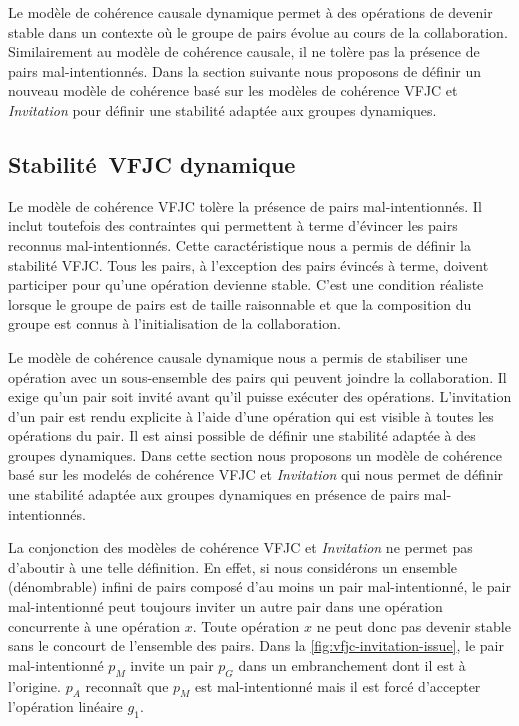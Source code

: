 Le modèle de cohérence causale dynamique permet à des opérations de devenir stable dans un contexte où le groupe de pairs évolue au cours de la collaboration.
Similairement au modèle de cohérence causale, il ne tolère pas la présence de pairs mal-intentionnés.
Dans la section suivante nous proposons de définir un nouveau modèle de cohérence basé sur les modèles de cohérence \acs{VFJC} et \emph{Invitation} pour définir une stabilité adaptée aux groupes dynamiques.


\subsection{Stabilité~\acl{VFJC} dynamique}\label{subsec:dvfjcs}

Le modèle de cohérence \ac{VFJC} tolère la présence de pairs mal-intentionnés.
Il inclut toutefois des contraintes qui permettent à terme d'évincer les pairs reconnus mal-intentionnés.
Cette caractéristique nous a permis de définir la stabilité \ac{VFJC}.
Tous les pairs, à l'exception des pairs évincés à terme, doivent participer pour qu'une opération devienne stable.
C'est une condition réaliste lorsque le groupe de pairs est de taille raisonnable et que la composition du groupe est connus à l'initialisation de la collaboration.

Le modèle de cohérence causale dynamique nous a permis de stabiliser une opération avec un sous-ensemble des pairs qui peuvent joindre la collaboration.
Il exige qu'un pair soit invité avant qu'il puisse exécuter des opérations.
L'invitation d'un pair est rendu explicite à l'aide d'une opération qui est visible à toutes les opérations du pair.
Il est ainsi possible de définir une stabilité adaptée à des groupes dynamiques.
Dans cette section nous proposons un modèle de cohérence basé sur les modelés de cohérence \acs{VFJC} et \emph{Invitation} qui nous permet de définir une stabilité adaptée aux groupes dynamiques en présence de pairs mal-intentionnés.

La conjonction des modèles de cohérence \acs{VFJC} et \emph{Invitation} ne permet pas d'aboutir à une telle définition.
En effet, si nous considérons un ensemble (dénombrable) infini de pairs composé d'au moins un pair mal-intentionné, le pair mal-intentionné peut toujours inviter un autre pair dans une opération concurrente à une opération $x$.
Toute opération $x$ ne peut donc pas devenir stable sans le concourt de l'ensemble des pairs.
Dans la \autoref{fig:vfjc-invitation-issue}, le pair mal-intentionné $p_M$ invite un pair $p_G$ dans un embranchement dont il est à l'origine.
$p_A$ reconnaît que $p_M$ est mal-intentionné mais il est forcé d'accepter l'opération linéaire $g_1$.

